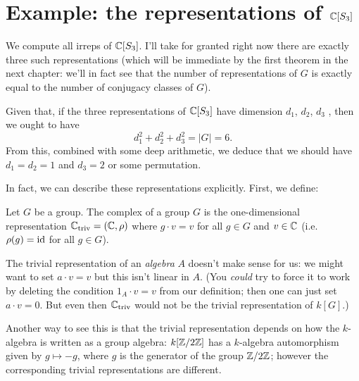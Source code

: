 \section{Example: the representations of $\mathbb C[S_3]$}
We compute all irreps of $\mathbb C[S_3]$.
I'll take for granted right now there are exactly three such representations
(which will be immediate by the first theorem in the next chapter:
we'll in fact see that the number of representations of $G$
is exactly equal to the number of conjugacy classes of $G$).

Given that, if the three representations of $\mathbb C[S_3]$ have dimension $d_1$, $d_2$, $d_3$ ,
then we ought to have
\[ d_1^2 + d_2^2 + d_3^2 = |G| = 6. \]
From this, combined with some deep arithmetic,
we deduce that we should have $d_1 = d_2 = 1$ and $d_3 = 2$
or some permutation.

In fact, we can describe these representations explicitly.
First, we define:
\begin{definition}
	Let $G$ be a group.
	The complex  of a group $G$
	is the one-dimensional representation $\mathbb C_{\mathrm{triv}} = (\mathbb C, \rho)$
	where $g \cdot v = v$ for all $g \in G$ and $v \in \mathbb C$
	(i.e.\ $\rho(g) = \mathrm{id}$ for all $g \in G$).
\end{definition}
\begin{remark}
	[Warning] The trivial representation of an \emph{algebra} $A$
	doesn't make sense for us:
	we might want to set $a \cdot v = v$ but this isn't linear in $A$.
	(You \emph{could} try to force it to work by
	deleting the condition $1_A \cdot v = v$ from our definition;
	then one can just set $a \cdot v = 0$.
	But even then $\mathbb C_{\mathrm{triv}}$ would not be the trivial representation of $k[G]$.)

	Another way to see this is that the trivial representation
	depends on how the $k$-algebra is written as a group algebra:
	$k[\mathbb Z/2\mathbb Z]$ has a $k$-algebra automorphism given by $g \mapsto-g$, where
	$g$ is the generator of the group $\mathbb Z/2\mathbb Z$; however the corresponding
	trivial representations are different.
\end{remark}

